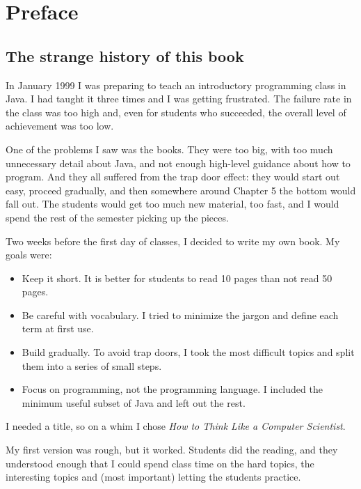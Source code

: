 \documentclass[10pt]{book}
\begin{document}
\fi


\chapter{Preface}

\section*{The strange history of this book}
In January 1999 I was preparing to teach an introductory programming
class in Java.  I had taught it three times and I was getting
frustrated.  The failure rate in the class was too high and, even for
students who succeeded, the overall level of achievement was too low.

One of the problems I saw was the books.
They were too big, with too much unnecessary detail about Java, and
not enough high-level guidance about how to program.  And they all
suffered from the trap door effect: they would start out easy,
proceed gradually, and then somewhere around Chapter 5 the bottom would
fall out.  The students would get too much new material, too fast,
and I would spend the rest of the semester picking up the pieces.

Two weeks before the first day of classes, I decided to write my
own book.
My goals were:

\begin{itemize}

\item Keep it short.  It is better for students to read 10 pages
than not read 50 pages.

\item Be careful with vocabulary.  I tried to minimize the jargon
and define each term at first use.

\item Build gradually. To avoid trap doors, I took the most difficult
topics and split them into a series of small steps.

\item Focus on programming, not the programming language.  I included
the minimum useful subset of Java and left out the rest.

\end{itemize}

I needed a title, so on a whim I chose {\em How to Think Like
a Computer Scientist}.

My first version was rough, but it worked.  Students did the reading,
and they understood enough that I could spend class time on the hard
topics, the interesting topics and (most important) letting the
students practice.
\end{document}
